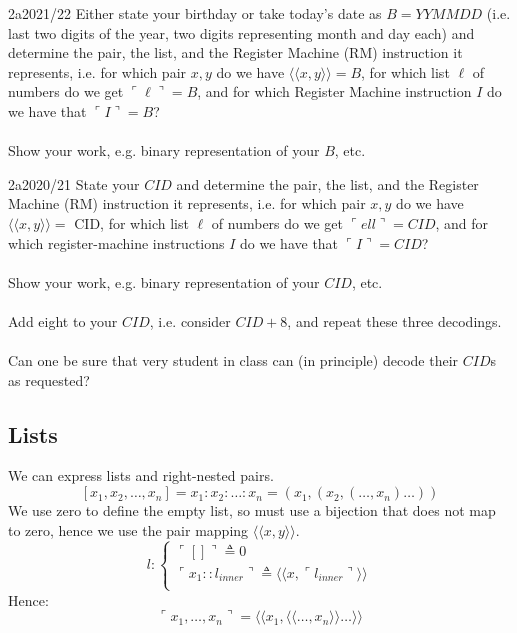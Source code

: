 \begin{exambox}{2a}{2021/22}
	Either state your birthday or take today's date as $B = YYMMDD$ (i.e. last two
	digits of the year, two digits representing month and day each) and determine the
	pair, the list, and the Register Machine (RM) instruction it represents, i.e. for
	which pair $x, y$ do we have $\langle \langle x, y \rangle \rangle = B$, for which list $\ell$ of numbers do we get
	$\ulcorner \ell \urcorner = B$, and for which Register Machine instruction $I$ do we have that
	$\ulcorner I \urcorner = B$?
	\\
	\\ Show your work, e.g. binary representation of your $B$, etc.
\end{exambox}
\begin{exambox}{2a}{2020/21}
	State your $CID$ and determine the pair, the list, and the Register Machine (RM)
	instruction it represents, i.e. for which pair $x, y$ do we have $\langle \langle x, y \rangle \rangle = $ CID, for
	which list $\ell$ of numbers do we get $\ulcorner ell \urcorner = CID$, and for which register-machine
	instructions $I$ do we have that $\ulcorner I \urcorner = CID$?
	\\
	\\ Show your work, e.g. binary representation of your $CID$, etc.
	\\
	\\ Add eight to your $CID$, i.e. consider $CID+8$, and repeat these three decodings.
	\\
	\\ Can one be sure that very student in class can (in principle) decode their $CID$s as requested?
\end{exambox}

\subsection{Lists}
We can express lists and right-nested pairs.
\[[x_1, x_2, \dots, x_n] = x_1:x_2:\dots:x_n = (x_1, (x_2, (\dots, x_n) \dots ))\]
We use zero to define the empty list, so must use a bijection that does not map to zero, hence we use the pair mapping $\langle\langle x,y \rangle\rangle$.
\[l : \begin{cases}
		\ulcorner [] \urcorner \triangleq 0                                                                            \\
		\ulcorner x_1 :: l_{inner} \urcorner \triangleq \langle\langle x, \ulcorner l_{inner} \urcorner \rangle\rangle \\
	\end{cases}\]
Hence:
\[\ulcorner x_1, \dots, x_n \urcorner = \langle\langle x_1 , \langle\langle \dots, x_n\rangle\rangle \dots \rangle\rangle\]
